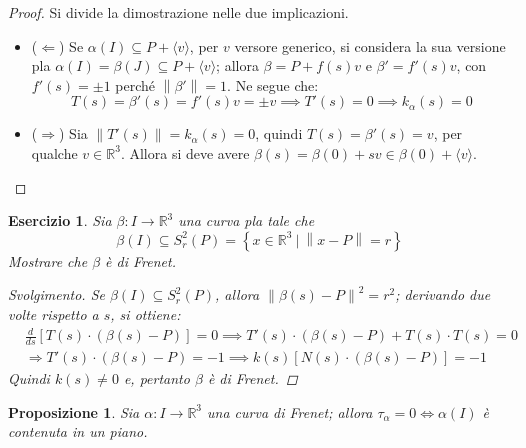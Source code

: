 \documentclass[12pt]{scrartcl}
\theoremstyle{style}
\newtheorem{prop}{Proposizione}[section]
\newtheorem{esercizio}{Esercizio}[section]
\newenvironment{svolgimento}{\renewcommand\qedsymbol{$\blacksquare$}\begin{proof}[Svolgimento]}{\end{proof}}
\numberwithin{equation}{subsection}
\begin{document}
	\begin{proof}
		Si divide la dimostrazione nelle due implicazioni.
		\begin{itemize}
			\item ($\Leftarrow$) Se $\alpha (I) \subseteq P+ \langle v \rangle$, per $v$ versore generico, si considera la sua versione pla $\alpha (I) = \beta (J) \subseteq P+\langle v \rangle$; allora $\beta = P + f(s) v$ e $\beta '=f'(s) v$, con $f'(s)=\pm 1$ perch\'e $\left\lVert \beta ' \right\rVert = 1$. 
				Ne segue che:
				\[
				T(s) = \beta '(s) = f'(s) v = \pm v \implies T'(s) = 0 \implies k_\alpha(s) = 0 
				\] 
			\item ($\Rightarrow $) Sia $\left\lVert T'(s) \right\rVert = k_\alpha (s) = 0 $, quindi $T(s) = \beta '(s) = v $, per qualche $v \in \mathbb{R}^3$.
				Allora si deve avere $\beta (s) =  \beta (0)+ s v \in \beta (0) +\langle v \rangle$.
		\end{itemize}
	\end{proof}
\begin{esercizio}
Sia $\beta :I \to \mathbb{R}^3$ una curva pla tale che
\[
\beta (I) \subseteq S_r^2(P) = \left\{ x \in \mathbb{R}^3 \ \big\lvert\ \left\lVert x- P \right\rVert = r\right\} 
\] 
Mostrare che $\beta  $ \`e di Frenet.
\begin{svolgimento}
	Se $\beta (I) \subseteq S_r^2(P)$, allora $\left\lVert \beta (s) - P \right\rVert ^2 = r^2$; derivando due volte rispetto a $s$, si ottiene:
	\[
		\begin{split}
			&\frac{d }{d s}\left[  T(s) \cdot (\beta (s) - P )  \right] = 0 \implies T'(s) \cdot (\beta (s) - P) + T(s) \cdot T(s) = 0 \\
			&\Rightarrow T'(s) \cdot (\beta (s) - P) = -1 \implies k(s) \left[ N(s) \cdot (\beta (s) - P) \right] = - 1
		\end{split}
	\] 
	Quindi $k(s) \neq 0$ e, pertanto $\beta $ \`e di Frenet.
\end{svolgimento}
\end{esercizio}
\begin{prop}
	Sia $\alpha  : I \to \mathbb{R}^3$ una curva di Frenet; allora $\tau _\alpha = 0 \iff \alpha (I)$ \`e contenuta in un piano.
\end{prop}
\end{document}
